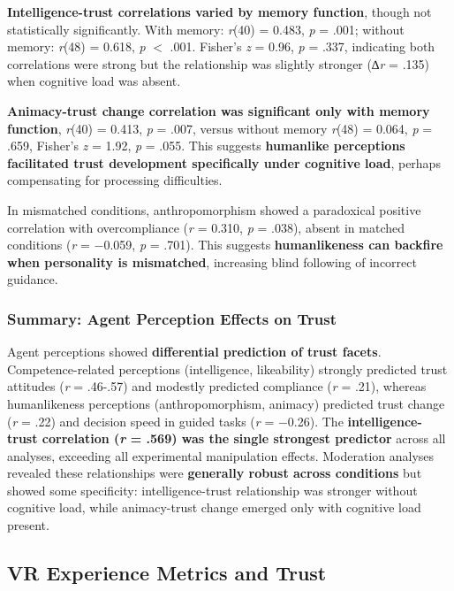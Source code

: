 \documentclass[12pt]{article}
\begin{document}
\textbf{Intelligence-trust correlations varied by memory function}, though not statistically significantly. With memory: \textit{r}(40) = 0.483, \textit{p} = .001; without memory: \textit{r}(48) = 0.618, \textit{p} $<$ .001. Fisher's \textit{z} = 0.96, \textit{p} = .337, indicating both correlations were strong but the relationship was slightly stronger (∆\textit{r} = .135) when cognitive load was absent.

\textbf{Animacy-trust change correlation was significant only with memory function}, \textit{r}(40) = 0.413, \textit{p} = .007, versus without memory \textit{r}(48) = 0.064, \textit{p} = .659, Fisher's \textit{z} = 1.92, \textit{p} = .055. This suggests \textbf{humanlike perceptions facilitated trust development specifically under cognitive load}, perhaps compensating for processing difficulties.

In mismatched conditions, anthropomorphism showed a paradoxical positive correlation with overcompliance (\textit{r} = 0.310, \textit{p} = .038), absent in matched conditions (\textit{r} = $-$0.059, \textit{p} = .701). This suggests \textbf{humanlikeness can backfire when personality is mismatched}, increasing blind following of incorrect guidance.

\subsubsection{Summary: Agent Perception Effects on Trust}

Agent perceptions showed \textbf{differential prediction of trust facets}. Competence-related perceptions (intelligence, likeability) strongly predicted trust attitudes (\textit{r} = .46-.57) and modestly predicted compliance (\textit{r} = .21), whereas humanlikeness perceptions (anthropomorphism, animacy) predicted trust change (\textit{r} = .22) and decision speed in guided tasks (\textit{r} = $-$0.26). The \textbf{intelligence-trust correlation (\textit{r} = .569) was the single strongest predictor} across all analyses, exceeding all experimental manipulation effects. Moderation analyses revealed these relationships were \textbf{generally robust across conditions} but showed some specificity: intelligence-trust relationship was stronger without cognitive load, while animacy-trust change emerged only with cognitive load present.

\subsection{VR Experience Metrics and Trust}
\end{document}
